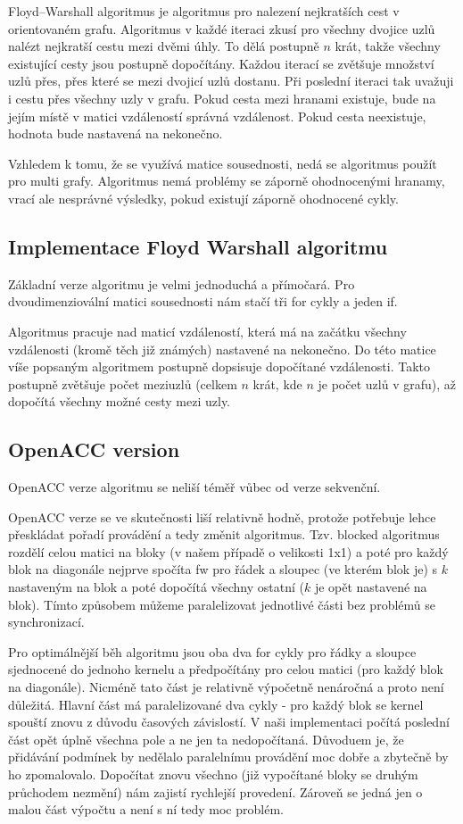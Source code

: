 \documentclass[11pt, fleqn]{article}
\begin{document}
Floyd–Warshall algoritmus je algoritmus pro nalezení nejkratších cest v orientovaném grafu. Algoritmus v každé iteraci zkusí pro všechny dvojice uzlů nalézt nejkratší cestu mezi dvěmi úhly. To dělá postupně $n$ krát, takže všechny existující cesty jsou postupně dopočítány. Každou iterací se zvětšuje množství uzlů přes, přes které se mezi dvojicí uzlů dostanu. Při poslední iteraci tak uvažuji i cestu přes všechny uzly v grafu. Pokud cesta mezi hranami existuje, bude na jejím místě v matici vzdáleností správná vzdálenost. Pokud cesta neexistuje, hodnota bude nastavená na nekonečno.

Vzhledem k tomu, že se využívá matice sousednosti, nedá se algoritmus použít pro multi grafy. Algoritmus nemá problémy se záporně ohodnocenými hranamy, vrací ale nesprávné výsledky, pokud existují záporně ohodnocené cykly.


\subsection{Implementace Floyd Warshall algoritmu}
Základní verze algoritmu je velmi jednoduchá a přímočará. Pro dvoudimenziovální matici sousednosti nám stačí tři for cykly a jeden if.

Algoritmus pracuje nad maticí vzdáleností, která má na začátku všechny vzdálenosti (kromě těch již známých) nastavené na nekonečno. Do této matice víše popsaným algoritmem postupně dopsisuje dopočítané vzdálenosti. Takto postupně zvětšuje počet meziuzlů (celkem $n$ krát, kde $n$ je počet uzlů v grafu), až dopočítá všechny možné cesty mezi uzly.


\subsection{OpenACC version}
OpenACC verze algoritmu se neliší téměř vůbec od verze sekvenční.

OpenACC verze se ve skutečnosti liší relativně hodně, protože potřebuje lehce přeskládat pořadí provádění a tedy změnit algoritmus. Tzv. blocked algoritmus rozdělí celou matici na bloky (v našem případě o velikosti 1x1) a poté pro každý blok na diagonále nejprve spočíta fw pro řádek a sloupec (ve kterém blok je) s $k$ nastaveným na blok a poté dopočítá všechny ostatní ($k$ je opět nastavené na blok). Tímto způsobem můžeme paralelizovat jednotlivé části bez problémů se synchronizací.

Pro optimálnější běh algoritmu jsou oba dva for cykly pro řádky a sloupce sjednocené do jednoho kernelu a předpočítány pro celou matici (pro každý blok na diagonále). Nicméně tato část je relativně výpočetně nenáročná a proto není důležitá. Hlavní část má paralelizované dva cykly - pro každý blok se kernel spouští znovu z důvodu časových závislostí. V naši implementaci počítá poslední část opět úplně všechna pole a ne jen ta nedopočítaná. Důvoduem je, že přidávání podmínek by nedělalo paralelnímu provádění moc dobře a zbytečně by ho zpomalovalo. Dopočítat znovu všechno (již vypočítané bloky se druhým průchodem nezmění) nám zajistí rychlejší provedení. Zároveň se jedná jen o malou část výpočtu a není s ní tedy moc problém.
\end{document}
